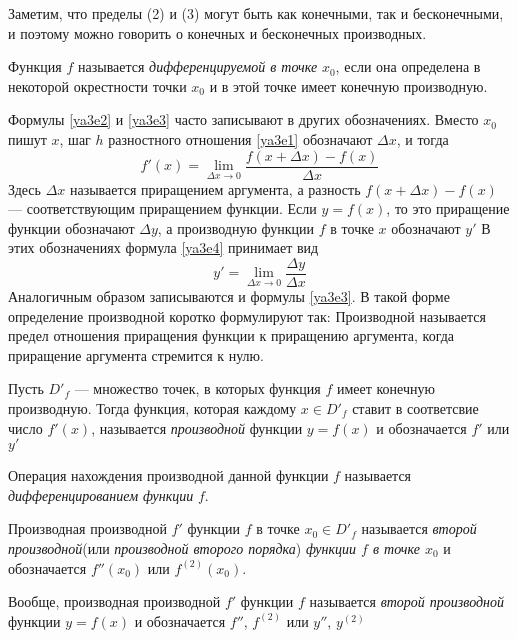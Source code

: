 Заметим, что пределы (2) и (3) могут быть как конечными, так и бесконечными, и поэтому можно говорить о конечных и бесконечных производных. 
\begin{defn} Функция $f$ называется \textit{дифференцируемой в точке} $x_0$, если она определена в некоторой окрестности точки $x_0$ и в этой точке имеет конечную производную.
\end{defn}
Формулы \eqref{ya3e2} и \eqref{ya3e3} часто записывают в других обозначениях. Вместо $x_0$ пишут $x$, шаг $h$ разностного отношения \eqref{ya3e1} обозначают $\Delta x$, и тогда	
\begin{equation}\label{ya3e4}
f'(x)=\lim_{\Delta x\to 0}\limits\frac{f(x+\Delta x)-f(x)}{\Delta x}
\end{equation}
Здесь $\Delta x$ называется приращением аргумента, а разность $f(x+\Delta x)-f(x)$ --- соответствующим приращением функции. Если $y = f(x)$, то это приращение функции обозначают $\Delta y$, а производную функции $f$ в точке $x$ обозначают $y'$ В этих обозначениях формула \eqref{ya3e4} принимает вид
$$
y'=\lim_{\Delta x \to 0}\limits \frac{\Delta y}{\Delta x}
$$
Аналогичным образом записываются и формулы \eqref{ya3e3}. В такой форме определение производной коротко формулируют так:
Производной называется предел отношения приращения функции к приращению аргумента, когда приращение аргумента стремится к нулю.	

\begin{defn}
Пусть $D'_f$ --- множество точек, в которых функция $f$ имеет конечную производную. Тогда функция, которая каждому $x \in D'_f$ ставит в соответсвие число $f'(x)$, называется \textit{производной} функции $y=f(x)$ и обозначается $f'$ или $y'$
\end{defn}
Операция нахождения производной данной функции $f$ называется \textit{дифференцированием функции} $f$.


\begin{defn}
Производная производной $f'$ функции $f$ в точке $x_0 \in D'_f$ называется \textit{второй производной}(или \textit{производной второго порядка}) \textit{функции $f$ в точке $x_0$} и обозначается $f''(x_0)$ или $f^{(2)}(x_0)$.
\end{defn}
Вообще, производная производной $f'$ функции $f$ называется \textit{второй производной} функции $y=f(x)$ и обозначается $f''$, $f^{(2)}$ или $y''$, $y^{(2)}$

